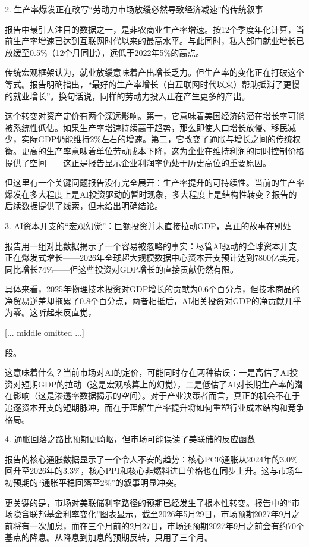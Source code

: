 \documentclass[11pt]{ctexart}
\begin{document}
2. 生产率爆发正在改写“劳动力市场放缓必然导致经济减速”的传统叙事

报告中最引人注目的数据之一，是非农商业生产率增速。按12个季度年化计算，当前生产率增速已达到互联网时代以来的最高水平。与此同时，私人部门就业增长已放缓至0.5\%（12个月同比），远低于2022年5\%的高点。

传统宏观框架认为，就业放缓意味着产出增长乏力。但生产率的变化正在打破这个等式。报告明确指出，“最好的生产率增长（自互联网时代以来）帮助抵消了更慢的就业增长”。换句话说，同样的劳动力投入正在产生更多的产出。

这个转变对资产定价有两个深远影响。第一，它意味着美国经济的潜在增长率可能被系统性低估。如果生产率增速持续高于趋势，那么即使人口增长放慢、移民减少，实际GDP仍能维持2\%左右的增速。第二，它改变了通胀与增长之间的传统权衡。更高的生产率意味着单位劳动成本下降，这为企业在维持利润的同时控制价格提供了空间——这正是报告显示企业利润率仍处于历史高位的重要原因。

但这里有一个关键问题报告没有完全展开：生产率提升的可持续性。当前的生产率爆发在多大程度上是AI投资驱动的暂时现象，多大程度上是结构性转变？报告的后续数据提供了线索，但未给出明确结论。

3. AI资本开支的“宏观幻觉”：巨额投资并未直接拉动GDP，真正的故事在别处

报告用一组对比数据揭示了一个容易被忽略的事实：尽管AI驱动的全球资本开支正在爆发式增长——2026年全球超大规模数据中心资本开支预计达到7800亿美元，同比增长74\%——但这些投资对GDP增长的直接贡献仍然有限。

具体来看，2025年物理技术投资对GDP增长的贡献为0.6个百分点，但技术商品的净贸易逆差却拖累了0.8个百分点，两者相抵后，AI相关投资对GDP的净贡献几乎为零。这听起来反直觉，

[... middle omitted ...]

段。

这意味着什么？当前市场对AI的定价，可能同时存在两种错误：一是高估了AI投资对短期GDP的拉动（这是宏观核算上的幻觉），二是低估了AI对长期生产率的潜在影响（这是渗透率数据揭示的空间）。对于产业决策者而言，真正的机会不在于追逐资本开支的短期脉冲，而在于理解生产率提升将如何重塑行业成本结构和竞争格局。

4. 通胀回落之路比预期更崎岖，但市场可能误读了美联储的反应函数

报告的核心通胀数据显示了一个令人不安的趋势：核心PCE通胀从2024年的3.0\%回升至2026年的3.3\%，核心PPI和核心非燃料进口价格也在同步上升。这与市场年初预期的“通胀平稳回落至2\%”的叙事明显冲突。

更关键的是，市场对美联储利率路径的预期已经发生了根本性转变。报告中的“市场隐含联邦基金利率变化”图表显示，截至2026年5月29日，市场预期2027年9月之前将有一次加息，而在三个月前的2月27日，市场还预期2027年9月之前会有约70个基点的降息。从降息到加息的预期反转，只用了三个月。
\end{document}
